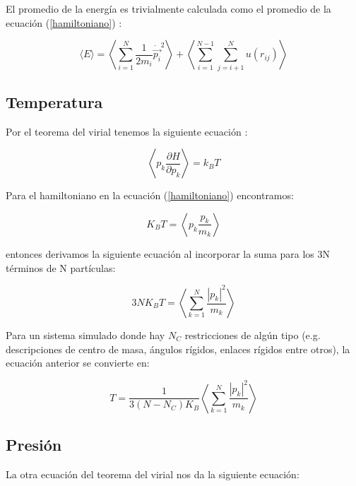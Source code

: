 El promedio de la energía es trivialmente calculada como el promedio de la ecuación (\ref{hamiltoniano}) \cite{Allen2017}:

\begin{equation} \label{promenergia}
    \langle E \rangle = \left \langle\sum_{i=1}^{N} \frac{1}{2 m_i}\dot{\vec{p_i}}^2 \right \rangle+ \left \langle\sum_{i=1}^{N-1}\sum_{j=i+1}^{N} u(r_{ij})\right \rangle
\end{equation}

\subsection{Temperatura}

Por el teorema del virial tenemos la siguiente ecuación \cite{Allen2017}:

\begin{equation} \label{virialtheorem}
    \left \langle p_k \frac{\partial H}{\partial p_k} \right \rangle = k_B T
\end{equation}

Para el hamiltoniano en la ecuación (\ref{hamiltoniano}) encontramos:

\begin{equation} \label{virialtemp}
    K_B T = \left \langle p_k \frac{p_k}{m_k} \right \rangle
\end{equation}

entonces derivamos la siguiente ecuación al incorporar la suma para los 3N términos de N partículas:

\begin{equation} \label{virialsumtemp}
    3NK_B T = \left \langle \sum_{k=1}^{N}\frac{|p_k|^2}{m_k} \right \rangle
\end{equation}

Para un sistema simulado donde hay $N_C$ restricciones de algún tipo (e.g. descripciones de centro de masa, ángulos rígidos, enlaces rígidos entre otros), la ecuación anterior se convierte en:

\begin{equation} \label{virialsumconsttemp}
    T= \frac{1}{3(N - N_C)K_B}\left \langle \sum_{k=1}^{N}\frac{|p_k|^2}{m_k} \right \rangle
\end{equation}

\subsection{Presión}

La otra ecuación del teorema del virial nos da la siguiente ecuación:

